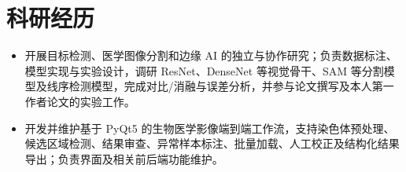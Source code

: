 
\section{科研经历}

\begin{itemize}
\cvprojectbodyfont
    \item 开展目标检测、医学图像分割和边缘 AI 的独立与协作研究；负责数据标注、模型实现与实验设计，调研 ResNet、DenseNet 等视觉骨干、SAM 等分割模型及线序检测模型，完成对比/消融与误差分析，并参与论文撰写及本人第一作者论文的实验工作。
    \item 开发并维护基于 PyQt5 的生物医学影像端到端工作流，支持染色体预处理、候选区域检测、结果审查、异常样本标注、批量加载、人工校正及结构化结果导出；负责界面及相关前后端功能维护。
\end{itemize}
